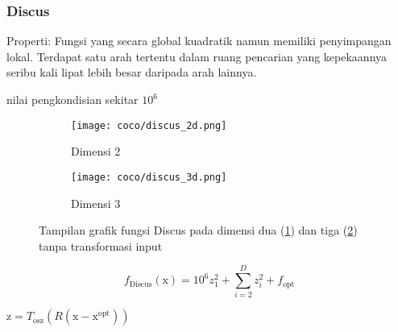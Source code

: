 \subsubsection{Discus}
\noindent Properti:
Fungsi yang secara global kuadratik namun memiliki penyimpangan lokal. Terdapat satu arah tertentu dalam ruang pencarian yang kepekaannya seribu kali lipat lebih besar daripada arah lainnya.
\begin{packed_item}
  \item nilai pengkondisian sekitar $10^6$
\end{packed_item}
\begin{figure}[H]
	\centering
	\begin{subfigure}[b]{0.4\textwidth}
		\centering
		\texttt{[image: coco/discus\_2d.png]}
		\caption{Dimensi 2}
		\label{fig:discus_coco_2d}
	\end{subfigure}
	\hfill
	\begin{subfigure}[b]{0.4\textwidth}
		\centering
		\texttt{[image: coco/discus\_3d.png]}
		\caption{Dimensi 3}
		\label{fig:discus_coco_3d}
	\end{subfigure}
	\caption{Tampilan grafik fungsi Discus pada dimensi dua (\cref{fig:discus_coco_2d}) dan tiga (\cref{fig:discus_coco_3d}) tanpa transformasi input}
	\label{fig:discus_coco}
\end{figure}
\begin{equation}
  f_{\text{Discus}}(\mathrm{x})=10^6z_1^2+\sum_{i=2}^{D}z_i^2+f_{\text{opt}}
\end{equation}
\begin{packed_item}
    \item $\mathrm{z}=T_{\text{osz}}(R(\mathrm{x}-\mathrm{x}^{\text{opt}}))$
\end{packed_item}

